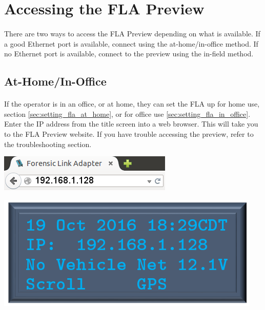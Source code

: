 \documentclass[11pt, oneside]{book}
\begin{document}
\section{Accessing the FLA Preview}
\paragraph{  }
There are two ways to access the FLA Preview depending on what is available. If a good Ethernet port is available, connect using the at-home/in-office method. If no Ethernet port is available, connect to the preview using the in-field method.
\subsection{At-Home/In-Office}
\paragraph{  }
If the operator is in an office, or at home, they can set the FLA up for home use, section \ref{sec:setting_fla_at_home}, or for office use \ref{sec:setting_fla_in_office}. Enter the IP address from the title screen into a web browser. This will take you to the FLA Preview website. If you have trouble accessing the preview, refer to the troubleshooting section.
\\[\baselineskip]
\noindent\begin{minipage}{0.45\textwidth}%
	\includegraphics[width=\linewidth]{../media/fla_preview_screenshots/url_correct_2} 
\end{minipage}%
\hfill%
\begin{minipage}{0.45\textwidth} 
	\includegraphics[width=\linewidth]{../media/pstricks_files/01_main_screen_1_128_ip}
\end{minipage}
\end{document}
